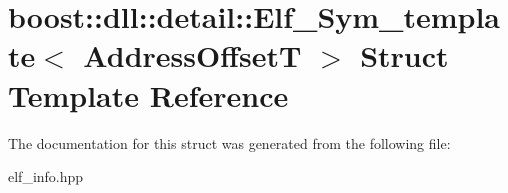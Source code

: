 \hypertarget{a00088}{}\section{boost\+:\+:dll\+:\+:detail\+:\+:Elf\+\_\+\+Sym\+\_\+template$<$ Address\+OffsetT $>$ Struct Template Reference}
\label{a00088}


The documentation for this struct was generated from the following file\+:\begin{DoxyCompactItemize}
\item 
elf\+\_\+info.\+hpp\end{DoxyCompactItemize}
